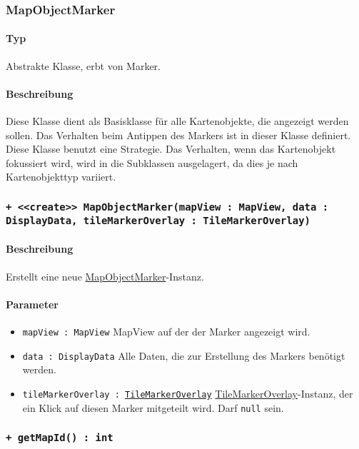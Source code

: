 \subsubsection{MapObjectMarker}\label{App_Map_View_MapObjectMarker}
\paragraph*{Typ}
Abstrakte Klasse, erbt von Marker.
\paragraph*{Beschreibung}
Diese Klasse dient als Basisklasse für alle Kartenobjekte, die angezeigt werden sollen.
Das Verhalten beim Antippen des Markers ist in dieser Klasse definiert.
Diese Klasse benutzt eine Strategie. Das Verhalten, wenn das Kartenobjekt fokussiert wird,
wird in die Subklassen ausgelagert, da dies je nach Kartenobjekttyp variiert.

\subsubsection*{\texttt{+ <<create>> MapObjectMarker(mapView : MapView, data : DisplayData, tileMarkerOverlay : TileMarkerOverlay)}}%
\paragraph*{Beschreibung}
Erstellt eine neue \hyperref[App_Map_View_MapObjectMarker]{MapObjectMarker}-Instanz.
\paragraph*{Parameter}
\begin{itemize}
    \item \texttt{mapView : MapView} MapView auf der der Marker angezeigt wird.
    \item \texttt{data : DisplayData} Alle Daten, die zur Erstellung des Markers benötigt werden.
    \item \texttt{tileMarkerOverlay : \hyperref[App_Map_View_TileMarkerOverlay]{TileMarkerOverlay}} \hyperref[App_Map_View_TileMarkerOverlay]{TileMarkerOverlay}-Instanz, der ein Klick 
    auf diesen Marker mitgeteilt wird. Darf \texttt{null} sein.
\end{itemize}

\subsubsection*{\texttt{+ getMapId() : int}}%
